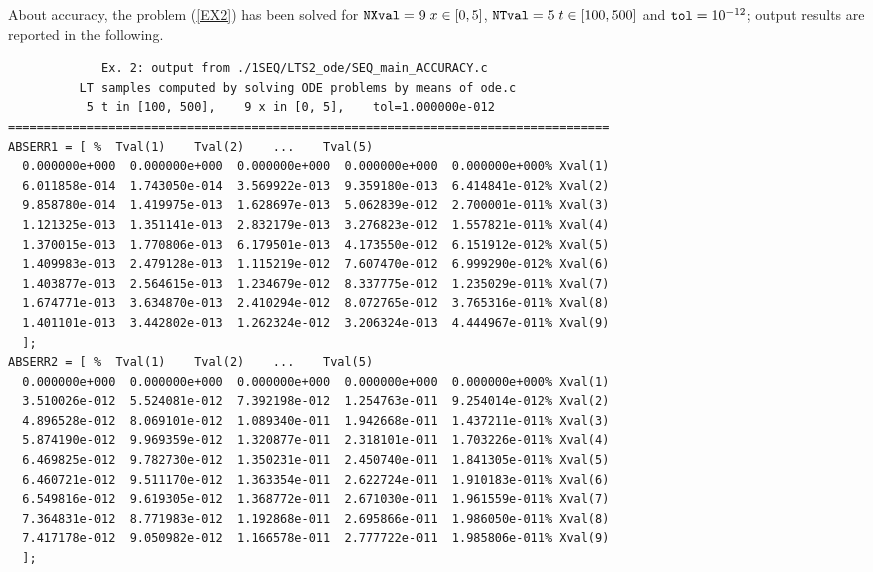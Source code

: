 \documentclass[a4paper,10pt]{report}%
\begin{document}
About accuracy, the problem (\ref{EX2}) has been solved for ${\tt NXval}=9\; x\in[0,5]$,
${\tt NTval}=5\; t\in[100,500]$ and ${\tt tol}=10^{-12}$; output results are reported in the following.
\begin{lstlisting}
             Ex. 2: output from ./1SEQ/LTS2_ode/SEQ_main_ACCURACY.c
          LT samples computed by solving ODE problems by means of ode.c
           5 t in [100, 500],    9 x in [0, 5],    tol=1.000000e-012
====================================================================================
ABSERR1 = [ %  Tval(1)    Tval(2)    ...    Tval(5)
  0.000000e+000  0.000000e+000  0.000000e+000  0.000000e+000  0.000000e+000% Xval(1)
  6.011858e-014  1.743050e-014  3.569922e-013  9.359180e-013  6.414841e-012% Xval(2)
  9.858780e-014  1.419975e-013  1.628697e-013  5.062839e-012  2.700001e-011% Xval(3)
  1.121325e-013  1.351141e-013  2.832179e-013  3.276823e-012  1.557821e-011% Xval(4)
  1.370015e-013  1.770806e-013  6.179501e-013  4.173550e-012  6.151912e-012% Xval(5)
  1.409983e-013  2.479128e-013  1.115219e-012  7.607470e-012  6.999290e-012% Xval(6)
  1.403877e-013  2.564615e-013  1.234679e-012  8.337775e-012  1.235029e-011% Xval(7)
  1.674771e-013  3.634870e-013  2.410294e-012  8.072765e-012  3.765316e-011% Xval(8)
  1.401101e-013  3.442802e-013  1.262324e-012  3.206324e-013  4.444967e-011% Xval(9)
  ];
ABSERR2 = [ %  Tval(1)    Tval(2)    ...    Tval(5)
  0.000000e+000  0.000000e+000  0.000000e+000  0.000000e+000  0.000000e+000% Xval(1)
  3.510026e-012  5.524081e-012  7.392198e-012  1.254763e-011  9.254014e-012% Xval(2)
  4.896528e-012  8.069101e-012  1.089340e-011  1.942668e-011  1.437211e-011% Xval(3)
  5.874190e-012  9.969359e-012  1.320877e-011  2.318101e-011  1.703226e-011% Xval(4)
  6.469825e-012  9.782730e-012  1.350231e-011  2.450740e-011  1.841305e-011% Xval(5)
  6.460721e-012  9.511170e-012  1.363354e-011  2.622724e-011  1.910183e-011% Xval(6)
  6.549816e-012  9.619305e-012  1.368772e-011  2.671030e-011  1.961559e-011% Xval(7)
  7.364831e-012  8.771983e-012  1.192868e-011  2.695866e-011  1.986050e-011% Xval(8)
  7.417178e-012  9.050982e-012  1.166578e-011  2.777722e-011  1.985806e-011% Xval(9)
  ];
\end{lstlisting}
\end{document}
